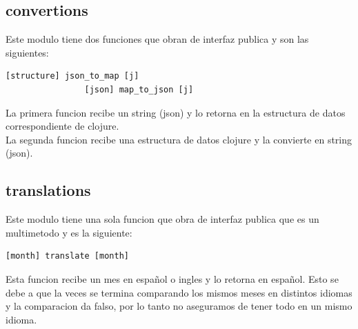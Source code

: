 \documentclass[a4paper, 12pt]{article}
\begin{document}
		\subsection{convertions}
			Este modulo tiene dos funciones que obran de interfaz publica y son las siguientes:
			\begin{lstlisting}[frame=tb, caption=firmas de la interfaz publica, label=zebra, tabsize=1]
				[structure] json_to_map [j]
				[json] map_to_json [j] 
			\end{lstlisting}
			La primera funcion recibe un string (json) y lo retorna en la estructura de datos correspondiente de clojure.\\
			La segunda funcion recibe una estructura de datos clojure y la convierte en string (json).\\

		\newpage
		\subsection{translations}
			Este modulo tiene una sola funcion que obra de interfaz publica que es un multimetodo y es la siguiente:
			\begin{lstlisting}[frame=tb, caption=firmas de la interfaz publica, label=zebra, tabsize=1]
				[month] translate [month]
			\end{lstlisting}
			Esta funcion recibe un mes en español o ingles y lo retorna en español. Esto se debe a que la veces se termina 				comparando los mismos meses en distintos idiomas y la comparacion da falso, por lo tanto  no aseguramos de tener todo 				en un mismo idioma.
			
\end{document}
